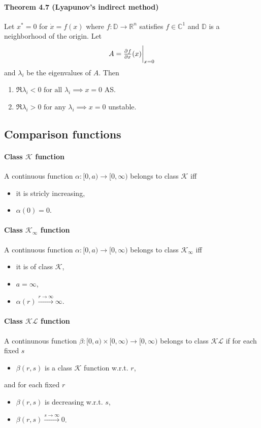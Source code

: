 \paragraph{Theorem 4.7 (Lyapunov's indirect method)}
Let $x^* = 0$ for $\dot{x} = f(x)$ where $f : \mathbb{D} \rightarrow \mathbb{R}^n$ satisfies $f \in \mathbb{C}^1$ and $\mathbb{D}$ is a neighborhood of the origin. Let
\begin{equation}
	A = \pd{f}{x} (x) \evalat{x = 0}
\end{equation}
and $\lambda_i$ be the eigenvalues of $A$. Then
\begin{enumerate}
	\item $\Re \lambda_i < 0 \mbox{ for all } \lambda_i \implies x = 0$ AS.
	\item $\Re \lambda_i > 0 \mbox{ for any } \lambda_i \implies x = 0$ unstable.
\end{enumerate}

\subsection{Comparison functions}
\paragraph{Class $\mathcal{K}$ function}
A continuous function $\alpha : [0,a) \to [0, \infty)$ belongs to class $\mathcal{K}$ iff
\begin{itemize}
	\item it is stricly increasing,
	\item $\alpha(0) = 0$.
\end{itemize}

\paragraph{Class $\mathcal{K}_\infty$ function}
A continuous function $\alpha : [0,a) \to [0, \infty)$ belongs to class $\mathcal{K}_\infty$ iff
\begin{itemize}
	\item it is of class $\mathcal{K}$,
	\item $a = \infty$,
	\item $\alpha(r) \xrightarrow{r \to \infty} \infty$.
\end{itemize}

\paragraph{Class $\mathcal{KL}$ function}
A continunous function $\beta : [0,a) \times [0,\infty) \to [0,\infty)$ belongs to class $\mathcal{KL}$ if for each fixed $s$
\begin{itemize}
	\item $\beta(r,s)$ is a class $\mathcal{K}$ function w.r.t. $r$,
\end{itemize}
and for each fixed $r$
\begin{itemize}
	\item $\beta(r,s)$ is decreasing w.r.t. $s$,
	\item $\beta(r,s) \xrightarrow{s \to \infty} 0$.
\end{itemize}

